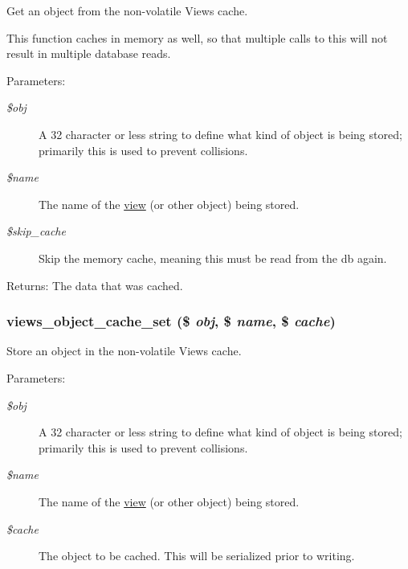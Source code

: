 Get an object from the non-volatile Views cache.

This function caches in memory as well, so that multiple calls to this will not result in multiple database reads.

\begin{Desc}
\item[Parameters:]
\begin{description}
\item[{\em \$obj}]A 32 character or less string to define what kind of object is being stored; primarily this is used to prevent collisions. \item[{\em \$name}]The name of the \hyperlink{classview}{view} (or other object) being stored. \item[{\em \$skip\_\-cache}]Skip the memory cache, meaning this must be read from the db again.\end{description}
\end{Desc}
\begin{Desc}
\item[Returns:]The data that was cached. \end{Desc}
\hypertarget{group__views__object__cache_ga26af6a03e0d169966b2a7fa2b09d75e}{
\subsubsection[{views\_\-object\_\-cache\_\-set}]{\setlength{\rightskip}{0pt plus 5cm}views\_\-object\_\-cache\_\-set (\$ {\em obj}, \/  \$ {\em name}, \/  \$ {\em cache})}}
\label{group__views__object__cache_ga26af6a03e0d169966b2a7fa2b09d75e}


Store an object in the non-volatile Views cache.

\begin{Desc}
\item[Parameters:]
\begin{description}
\item[{\em \$obj}]A 32 character or less string to define what kind of object is being stored; primarily this is used to prevent collisions. \item[{\em \$name}]The name of the \hyperlink{classview}{view} (or other object) being stored. \item[{\em \$cache}]The object to be cached. This will be serialized prior to writing. \end{description}
\end{Desc}
